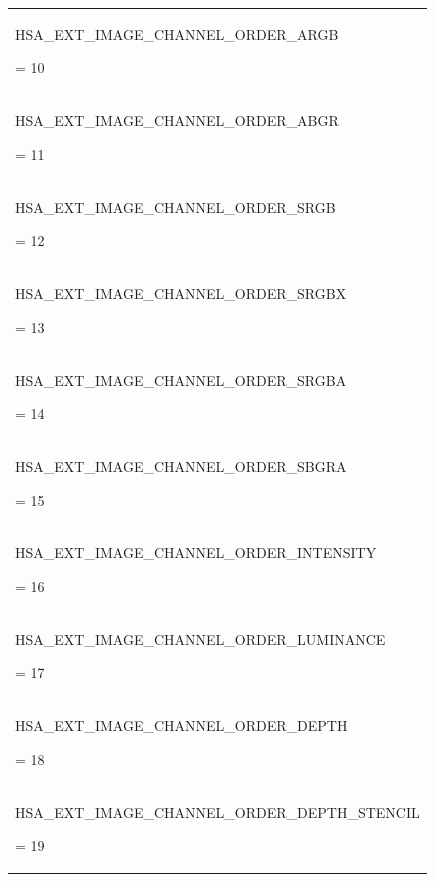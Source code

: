 \documentclass[final]{book}
\newcommand{\reftyp}[1]{#1}
\newcommand{\refenu}[1]{\reftyp{#1}}
\begin{document}
\begin{longtable}{@{\hspace{2em}}p{\linewidth-2em}}
\hspace{-2em}\hypertarget{group__images_1ggabaced4fb1f3b9fdaa978e143af5ff055a7a49085ae07e467293c0a10d003a2356}{\refenu{HSA_\-EXT_\-IMAGE_\-CHANNEL_\-ORDER_\-ARGB}} = 10\\[2mm]
\hspace{-2em}\hypertarget{group__images_1ggabaced4fb1f3b9fdaa978e143af5ff055a8fd833428ebe3e1428e0001115ec6880}{\refenu{HSA_\-EXT_\-IMAGE_\-CHANNEL_\-ORDER_\-ABGR}} = 11\\[2mm]
\hspace{-2em}\hypertarget{group__images_1ggabaced4fb1f3b9fdaa978e143af5ff055a64dbb297ed7cf48f525ffe32aa653319}{\refenu{HSA_\-EXT_\-IMAGE_\-CHANNEL_\-ORDER_\-SRGB}} = 12\\[2mm]
\hspace{-2em}\hypertarget{group__images_1ggabaced4fb1f3b9fdaa978e143af5ff055a38d8f1c70900f6646df6a6d20746f840}{\refenu{HSA_\-EXT_\-IMAGE_\-CHANNEL_\-ORDER_\-SRGBX}} = 13\\[2mm]
\hspace{-2em}\hypertarget{group__images_1ggabaced4fb1f3b9fdaa978e143af5ff055ae9980a3013f42e7d56f4fd28ea8c3b7c}{\refenu{HSA_\-EXT_\-IMAGE_\-CHANNEL_\-ORDER_\-SRGBA}} = 14\\[2mm]
\hspace{-2em}\hypertarget{group__images_1ggabaced4fb1f3b9fdaa978e143af5ff055a2617e3d26bbf6dd3c136534dcf5e4594}{\refenu{HSA_\-EXT_\-IMAGE_\-CHANNEL_\-ORDER_\-SBGRA}} = 15\\[2mm]
\hspace{-2em}\hypertarget{group__images_1ggabaced4fb1f3b9fdaa978e143af5ff055a5fb131f53f229f55456287a009da9b6e}{\refenu{HSA_\-EXT_\-IMAGE_\-CHANNEL_\-ORDER_\-INTENSITY}} = 16\\[2mm]
\hspace{-2em}\hypertarget{group__images_1ggabaced4fb1f3b9fdaa978e143af5ff055a5576d6ae7fd07c21fa8196c4323f1476}{\refenu{HSA_\-EXT_\-IMAGE_\-CHANNEL_\-ORDER_\-LUMINANCE}} = 17\\[2mm]
\hspace{-2em}\hypertarget{group__images_1ggabaced4fb1f3b9fdaa978e143af5ff055ad26aef84eb00f1d1e9defc45f7508e50}{\refenu{HSA_\-EXT_\-IMAGE_\-CHANNEL_\-ORDER_\-DEPTH}} = 18\\[2mm]
\hspace{-2em}\hypertarget{group__images_1ggabaced4fb1f3b9fdaa978e143af5ff055aa1c158a53efa2619ceefa748f3d99a99}{\refenu{HSA_\-EXT_\-IMAGE_\-CHANNEL_\-ORDER_\-DEPTH_\-STENCIL}} = 19
\end{longtable}
\end{document}
